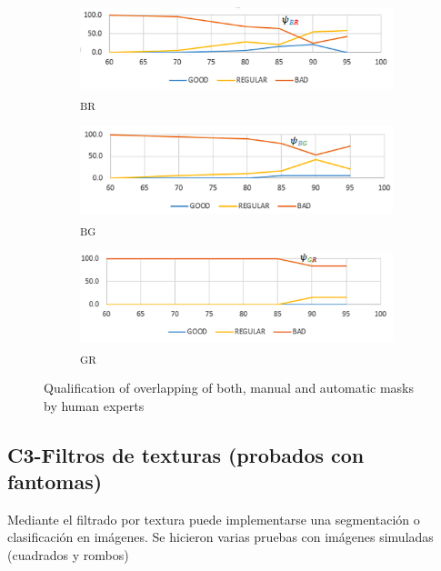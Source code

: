\begin{figure}
     \centering
     \begin{subfigure}[b]{0.3\textwidth}
         \centering
         \includegraphics[width=\textwidth]{Imagenes/psiBR.png}
         \caption{\textpsi \textsubscript{BR}}
         \label{psiBR}
     \end{subfigure}
     \hfill
     \begin{subfigure}[b]{0.3\textwidth}
         \centering
         \includegraphics[width=\textwidth]{Imagenes/psiBG.png}
         \caption{\textpsi \textsubscript{BG}}
         \label{psiBG}
     \end{subfigure}
     \hfill
     \begin{subfigure}[b]{0.3\textwidth}
         \centering
         \includegraphics[width=\textwidth]{Imagenes/psiGR.png}
         \caption{\textpsi \textsubscript{GR}}
         \label{psiGR}
     \end{subfigure}
        \caption{Qualification of overlapping of both, manual and automatic masks by human experts}
        \label{humanscoring}
\end{figure}

\subsection{C3-Filtros de texturas (probados con fantomas)}
Mediante el filtrado por textura puede implementarse una segmentación o clasificación en imágenes. Se hicieron varias pruebas con imágenes simuladas (cuadrados y rombos)
